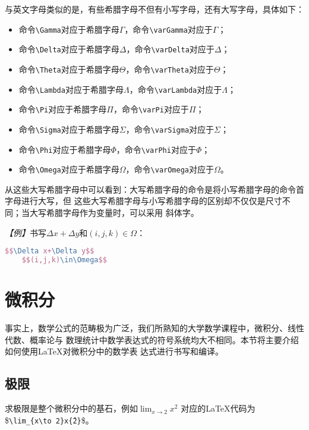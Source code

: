 与英文字母类似的是，有些希腊字母不但有小写字母，还有大写字母，具体如下：
\begin{itemize}
    \item 命令\texttt{\textbackslash{}Gamma}对应于希腊字母$\Gamma$，命令\texttt{\textbackslash{}varGamma}对应于$\varGamma$；
    \item 命令\texttt{\textbackslash{}Delta}对应于希腊字母$\Delta$，命令\texttt{\textbackslash{}varDelta}对应于$\varDelta$；
    \item 命令\texttt{\textbackslash{}Theta}对应于希腊字母$\Theta$，命令\texttt{\textbackslash{}varTheta}对应于$\varTheta$；
    \item 命令\texttt{\textbackslash{}Lambda}对应于希腊字母$\Lambda$，命令\texttt{\textbackslash{}varLambda}对应于$\varLambda$；
    \item 命令\texttt{\textbackslash{}Pi}对应于希腊字母$\Pi$，命令\texttt{\textbackslash{}varPi}对应于$\varPi$；
    \item 命令\texttt{\textbackslash{}Sigma}对应于希腊字母$\Sigma$，命令\texttt{\textbackslash{}varSigma}对应于$\varSigma$；
    \item 命令\texttt{\textbackslash{}Phi}对应于希腊字母$\Phi$，命令\texttt{\textbackslash{}varPhi}对应于$\varPhi$；
    \item 命令\texttt{\textbackslash{}Omega}对应于希腊字母$\Omega$，命令\texttt{\textbackslash{}varOmega}对应于$\varOmega$。
\end{itemize}

从这些大写希腊字母中可以看到：大写希腊字母的命令是将小写希腊字母的命令首字母进行大写，但
这些大写希腊字母与小写希腊字母的区别却不仅仅是尺寸不同；当大写希腊字母作为变量时，可以采用
斜体字。

\emph{【例】}书写$\Delta x+\Delta y$和$(i,j,k)\in\Omega$：
\begin{lstlisting}[language=TeX]
    $$\Delta x+\Delta y$$
    $$(i,j,k)\in\Omega$$
\end{lstlisting}

\section{微积分}
事实上，数学公式的范畴极为广泛，我们所熟知的大学数学课程中，微积分、线性代数、概率论与
数理统计中数学表达式的符号系统均大不相同。本节将主要介绍如何使用LaTeX对微积分中的数学表
达式进行书写和编译。

\subsection{极限}
求极限是整个微积分中的基石，例如$\lim_{x\to 2}x^{2}$ 对应的LaTeX代码为
\$\texttt{\textbackslash{}lim\_\{x\textbackslash{}to 2\}x\^\{2\}}\$。

